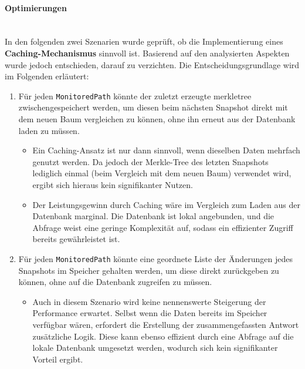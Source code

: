 \documentclass[a4paper,12pt]{report}
\begin{document}
    \clearpage

    \paragraph*{Optimierungen}\mbox{}\\
    In den folgenden zwei Szenarien wurde geprüft, ob die Implementierung eines \textbf{Caching-Mechanismus} sinnvoll ist.
    Basierend auf den analysierten Aspekten wurde jedoch entschieden, darauf zu verzichten.
    Die Entscheidungsgrundlage wird im Folgenden erläutert:
    \begin{enumerate}
        \item Für jeden \texttt{MonitoredPath} könnte der zuletzt erzeugte \gls{merkletree} zwischengespeichert werden, um diesen beim nächsten Snapshot direkt mit dem neuen Baum vergleichen zu können,
        ohne ihn erneut aus der Datenbank laden zu müssen.
        \begin{itemize}
            \item Ein Caching-Ansatz ist nur dann sinnvoll, wenn dieselben Daten mehrfach genutzt werden.
            Da jedoch der Merkle-Tree des letzten Snapshots lediglich einmal (beim Vergleich mit dem neuen Baum) verwendet wird, ergibt sich hieraus kein signifikanter Nutzen.
            \item Der Leistungsgewinn durch Caching wäre im Vergleich zum Laden aus der Datenbank marginal.
            Die Datenbank ist lokal angebunden, und die Abfrage weist eine geringe Komplexität auf, sodass ein effizienter Zugriff bereits gewährleistet ist.
        \end{itemize}
        \item Für jeden \texttt{MonitoredPath} könnte eine geordnete Liste der Änderungen jedes Snapshots im Speicher gehalten werden, um diese direkt zurückgeben zu können,
        ohne auf die Datenbank zugreifen zu müssen.
        \begin{itemize}
            \item Auch in diesem Szenario wird keine nennenswerte Steigerung der Performance erwartet.
            Selbst wenn die Daten bereits im Speicher verfügbar wären, erfordert die Erstellung der zusammengefassten Antwort zusätzliche Logik.
            Diese kann ebenso effizient durch eine Abfrage auf die lokale Datenbank umgesetzt werden, wodurch sich kein signifikanter Vorteil ergibt.
        \end{itemize}
    \end{enumerate}
\end{document}
